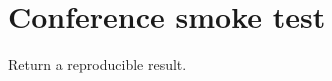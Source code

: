 \documentclass{article}
\begin{document}
\section*{Conference smoke test}
\begin{algorithm}
  \caption{A small algorithm}
  \begin{algorithmic}
    \STATE Return a reproducible result.
  \end{algorithmic}
\end{algorithm}
\end{document}
